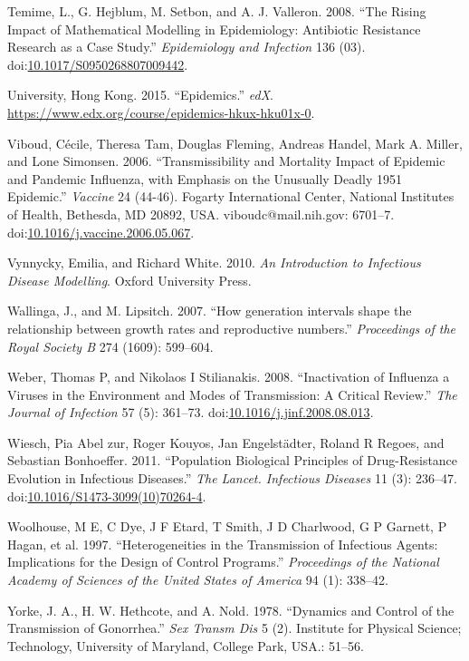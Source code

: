 \documentclass[]{article}
\theoremstyle{definition}
\theoremstyle{definition}
\theoremstyle{definition}
\theoremstyle{remark}
\begin{document}
\hypertarget{ref-temime08}{}
Temime, L., G. Hejblum, M. Setbon, and A. J. Valleron. 2008. ``The
Rising Impact of Mathematical Modelling in Epidemiology: Antibiotic
Resistance Research as a Case Study.'' \emph{Epidemiology and Infection}
136 (03).
doi:\href{https://doi.org/10.1017/S0950268807009442}{10.1017/S0950268807009442}.

\hypertarget{ref-hkepidemics}{}
University, Hong Kong. 2015. ``Epidemics.'' \emph{edX}.
\url{https://www.edx.org/course/epidemics-hkux-hku01x-0}.

\hypertarget{ref-viboud06}{}
Viboud, Cécile, Theresa Tam, Douglas Fleming, Andreas Handel, Mark A.
Miller, and Lone Simonsen. 2006. ``Transmissibility and Mortality Impact
of Epidemic and Pandemic Influenza, with Emphasis on the Unusually
Deadly 1951 Epidemic.'' \emph{Vaccine} 24 (44-46). Fogarty International
Center, National Institutes of Health, Bethesda, MD 20892, USA.
viboudc@mail.nih.gov: 6701--7.
doi:\href{https://doi.org/10.1016/j.vaccine.2006.05.067}{10.1016/j.vaccine.2006.05.067}.

\hypertarget{ref-vynnycky10}{}
Vynnycky, Emilia, and Richard White. 2010. \emph{An Introduction to
Infectious Disease Modelling}. Oxford University Press.

\hypertarget{ref-wallinga07}{}
Wallinga, J., and M. Lipsitch. 2007. ``How generation intervals shape
the relationship between growth rates and reproductive numbers.''
\emph{Proceedings of the Royal Society B} 274 (1609): 599--604.

\hypertarget{ref-weber08}{}
Weber, Thomas P, and Nikolaos I Stilianakis. 2008. ``Inactivation of
Influenza a Viruses in the Environment and Modes of Transmission: A
Critical Review.'' \emph{The Journal of Infection} 57 (5): 361--73.
doi:\href{https://doi.org/10.1016/j.jinf.2008.08.013}{10.1016/j.jinf.2008.08.013}.

\hypertarget{ref-wiesch11}{}
Wiesch, Pia Abel zur, Roger Kouyos, Jan Engelstädter, Roland R Regoes,
and Sebastian Bonhoeffer. 2011. ``Population Biological Principles of
Drug-Resistance Evolution in Infectious Diseases.'' \emph{The Lancet.
Infectious Diseases} 11 (3): 236--47.
doi:\href{https://doi.org/10.1016/S1473-3099(10)70264-4}{10.1016/S1473-3099(10)70264-4}.

\hypertarget{ref-woolhouse97}{}
Woolhouse, M E, C Dye, J F Etard, T Smith, J D Charlwood, G P Garnett, P
Hagan, et al. 1997. ``Heterogeneities in the Transmission of Infectious
Agents: Implications for the Design of Control Programs.''
\emph{Proceedings of the National Academy of Sciences of the United
States of America} 94 (1): 338--42.

\hypertarget{ref-yorke78}{}
Yorke, J. A., H. W. Hethcote, and A. Nold. 1978. ``Dynamics and Control
of the Transmission of Gonorrhea.'' \emph{Sex Transm Dis} 5 (2).
Institute for Physical Science; Technology, University of Maryland,
College Park, USA.: 51--56.
\end{document}
